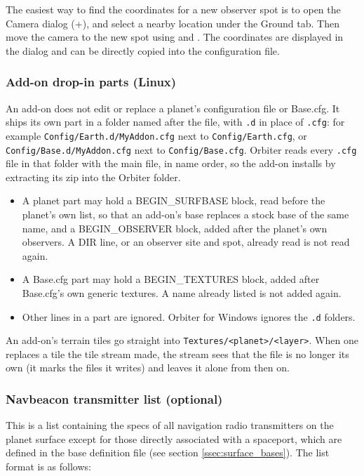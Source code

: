 \documentclass[Orbiter Developer Manual.tex]{subfiles}
\begin{document}
\noindent
The easiest way to find the coordinates for a new observer spot is to open the Camera dialog (\Ctrl+), and select a nearby location under the Ground tab. Then move the camera to the new spot using \Ctrl\DArrow\UArrow\RArrow\LArrow and . The coordinates are displayed in the dialog and can be directly copied into the configuration file.

\subsubsection*{Add-on drop-in parts (Linux)}
An add-on does not edit or replace a planet's configuration file or Base.cfg. It ships its own part in a folder named after the file, with \texttt{.d} in place of \texttt{.cfg}: for example \texttt{Config/Earth.d/MyAddon.cfg} next to \texttt{Config/Earth.cfg}, or \texttt{Config/Base.d/MyAddon.cfg} next to \texttt{Config/Base.cfg}. Orbiter reads every \texttt{.cfg} file in that folder with the main file, in name order, so the add-on installs by extracting its zip into the Orbiter folder.
\begin{itemize}
\item A planet part may hold a BEGIN\_SURFBASE block, read before the planet's own list, so that an add-on's base replaces a stock base of the same name, and a BEGIN\_OBSERVER block, added after the planet's own observers. A DIR line, or an observer site and spot, already read is not read again.
\item A Base.cfg part may hold a BEGIN\_TEXTURES block, added after Base.cfg's own generic textures. A name already listed is not added again.
\item Other lines in a part are ignored. Orbiter for Windows ignores the \texttt{.d} folders.
\end{itemize}
An add-on's terrain tiles go straight into \texttt{Textures/<planet>/<layer>}. When one replaces a tile the tile stream made, the stream sees that the file is no longer its own (it marks the files it writes) and leaves it alone from then on.


\subsubsection*{Navbeacon transmitter list (optional)}
This is a list containing the specs of all navigation radio transmitters on the planet surface except for those directly associated with a spaceport, which are defined in the base definition file (see section \ref{ssec:surface_bases}). The list format is as follows:
\end{document}
